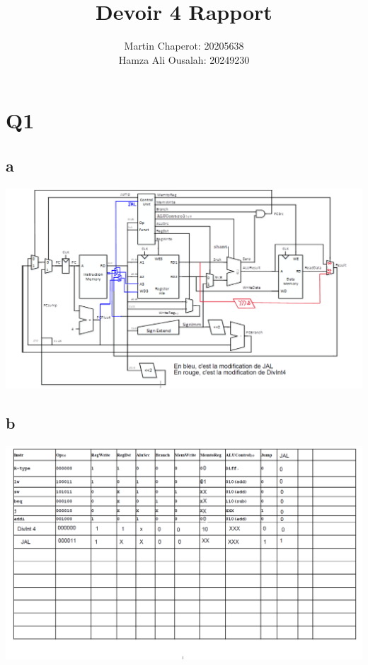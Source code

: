 \documentclass[11pt]{article}
\author{Martin Chaperot: 20205638 \\ Hamza Ali Ousalah: 20249230}
\date{}
\title{Devoir 4 Rapport}
\begin{document}
\maketitle

\section{Q1}
\subsection{a}
\begin{center}
\includegraphics[width=.9\linewidth]{./Question_1_a.png}
\end{center}
\subsection{b}
\begin{center}
\includegraphics[width=.9\linewidth]{./Question_1_b.png}
\end{center}
\end{document}
